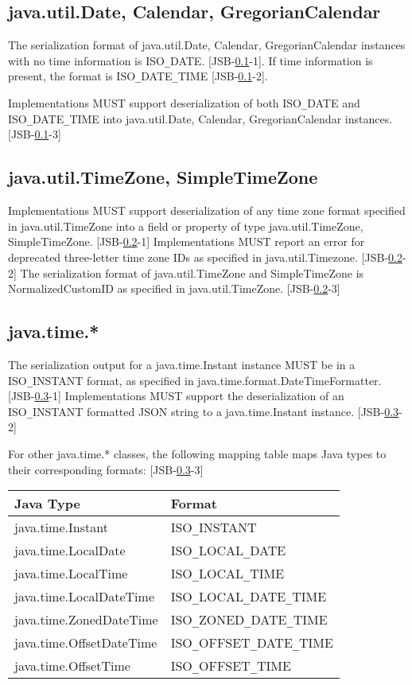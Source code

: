 \subsection{java.util.Date, Calendar, GregorianCalendar}
\label{subsec:datecalendar}
The serialization format of java.util.Date, Calendar, GregorianCalendar instances with no time information is ISO\verb|_|DATE. [JSB-\ref{subsec:datecalendar}-1]. If time information is present, the format is ISO\verb|_|DATE\verb|_|TIME [JSB-\ref{subsec:datecalendar}-2].

Implementations MUST support deserialization of both ISO\verb|_|DATE and ISO\verb|_|DATE\verb|_|TIME into java.util.Date, Calendar, GregorianCalendar instances. [JSB-\ref{subsec:datecalendar}-3]

\subsection{java.util.TimeZone, SimpleTimeZone}
\label{subsec:dateTimezone}

Implementations MUST support deserialization of any time zone format specified in java.util.TimeZone into a field or property of type java.util.TimeZone, SimpleTimeZone. [JSB-\ref{subsec:dateTimezone}-1] 
Implementations MUST report an error for deprecated three-letter time zone IDs as specified in java.util.Timezone. [JSB-\ref{subsec:dateTimezone}-2]
The serialization format of java.util.TimeZone and SimpleTimeZone is NormalizedCustomID as specified in java.util.TimeZone. [JSB-\ref{subsec:dateTimezone}-3]

\subsection{java.time.*}
\label{subsec:time}

The serialization output for a java.time.Instant instance MUST be in a ISO\verb|_|INSTANT format, as specified in java.time.format.DateTimeFormatter. [JSB-\ref{subsec:time}-1]
Implementations MUST support the deserialization of an ISO\verb|_|INSTANT formatted JSON string to a java.time.Instant instance. [JSB-\ref{subsec:time}-2]

For other java.time.* classes, the following mapping table maps Java types to their corresponding formats: [JSB-\ref{subsec:time}-3]

\begin{tabularx}{\textwidth}{ |X|X| }
\hline
Java Type & Format \\ 
\hline
java.time.Instant & ISO\verb|_|INSTANT\\
java.time.LocalDate & ISO\verb|_|LOCAL\verb|_|DATE\\
java.time.LocalTime & ISO\verb|_|LOCAL\verb|_|TIME\\
java.time.LocalDateTime & ISO\verb|_|LOCAL\verb|_|DATE\verb|_|TIME\\
java.time.ZonedDateTime & ISO\verb|_|ZONED\verb|_|DATE\verb|_|TIME\\
java.time.OffsetDateTime & ISO\verb|_|OFFSET\verb|_|DATE\verb|_|TIME\\
java.time.OffsetTime & ISO\verb|_|OFFSET\verb|_|TIME\\
\hline
\end{tabularx}

